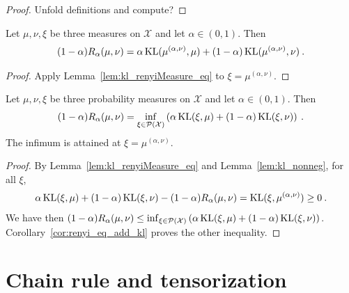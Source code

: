 \begin{proof}
Unfold definitions and compute?
\end{proof}

\begin{corollary}
  \label{cor:renyi_eq_add_kl}
  Let $\mu, \nu, \xi$ be three measures on $\mathcal X$ and let $\alpha \in (0, 1)$. Then
  \begin{align*}
  (1 - \alpha) R_\alpha(\mu, \nu) = \alpha \operatorname{KL}(\mu^{(\alpha, \nu)}, \mu) + (1 - \alpha)\operatorname{KL}(\mu^{(\alpha, \nu)}, \nu) \: .
  \end{align*}
\end{corollary}

\begin{proof}
Apply Lemma~\ref{lem:kl_renyiMeasure_eq} to $\xi = \mu^{(\alpha, \nu)}$.
\end{proof}

\begin{lemma}
  \label{lem:renyi_eq_inf_add_kl}
  Let $\mu, \nu, \xi$ be three probability measures on $\mathcal X$ and let $\alpha \in (0, 1)$. Then
  \begin{align*}
  (1 - \alpha) R_\alpha(\mu, \nu) = \inf_{\xi \in \mathcal P(\mathcal X)}\left( \alpha \operatorname{KL}(\xi, \mu) + (1 - \alpha)\operatorname{KL}(\xi, \nu) \right) \: .
  \end{align*}
  The infimum is attained at $\xi = \mu^{(\alpha, \nu)}$.
\end{lemma}

\begin{proof}
By Lemma~\ref{lem:kl_renyiMeasure_eq} and Lemma~\ref{lem:kl_nonneg}, for all $\xi$,
\begin{align*}
\alpha \operatorname{KL}(\xi, \mu) + (1 - \alpha)\operatorname{KL}(\xi, \nu) - (1 - \alpha) R_\alpha(\mu, \nu)
= \operatorname{KL}(\xi, \mu^{(\alpha, \nu)})
\ge 0 \: .
\end{align*}
We have then $(1 - \alpha) R_\alpha(\mu, \nu) \le \inf_{\xi \in \mathcal P(\mathcal X)}\left( \alpha \operatorname{KL}(\xi, \mu) + (1 - \alpha)\operatorname{KL}(\xi, \nu) \right)$.
Corollary~\ref{cor:renyi_eq_add_kl} proves the other inequality.
\end{proof}

\section{Chain rule and tensorization}

